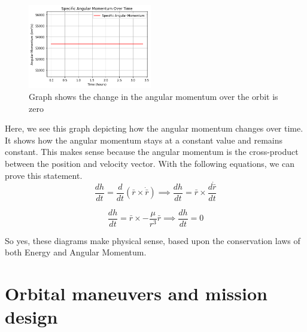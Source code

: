 \documentclass[12pt,twocolumn]{article}  %
\begin{document}
\begin{figure}[H]
    \centering
    \includegraphics[width=0.48\textwidth]{Images/124-L.png}
    \caption{Graph shows the change in the angular momentum over the orbit is zero}
\end{figure}
\noindent Here, we see this graph depicting how the angular momentum changes over time. It shows how the angular momentum stays 
at a constant value and remains constant. This makes sense because the angular momentum is the cross-product between the position and velocity vector.
With the following equations, we can prove this statement.
\setcounter{equation}{0}
\begin{equation}
\frac{dh}{dt} = \frac{d}{dt}(\bar{r} \times \dot{\bar{r}}) \implies \frac{dh}{dt} = \bar{r} \times \frac{d\dot{\bar{r}}}{dt}
\end{equation}

\begin{equation}
\frac{dh}{dt} = \bar{r} \times -\frac{\mu}{r^{3}}\bar{r} \implies \frac{dh}{dt} = 0
\end{equation}
\vspace{0.2cm}

So yes, these diagrams make physical sense, based upon the conservation laws of both Energy and Angular Momentum.


\section{Orbital maneuvers and mission design}
\end{document}
